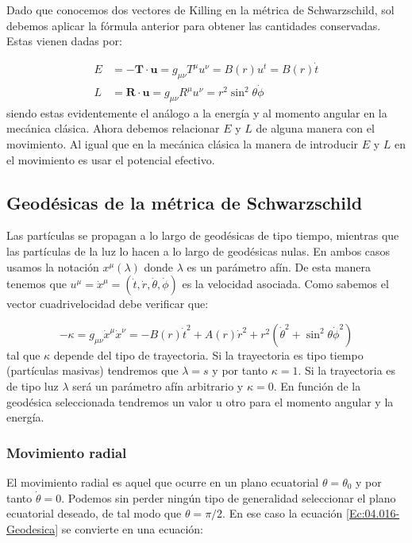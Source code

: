 \documentclass[12pt,a4paper]{book}
\numberwithin{equation}{section}
\numberwithin{figure}{section}
\newcommand{\un}{\mathbf{u}}
\newcommand{\Rn}{\mathbf{R}}
\newcommand{\Tn}{\mathbf{T}}
\begin{document}
Dado que conocemos dos vectores de Killing en la métrica de Schwarzschild, sol debemos aplicar la fórmula anterior para obtener las cantidades conservadas. Estas vienen dadas por:

\begin{align}
E  & = - \Tn \cdot \un = g_{\mu \nu} T^\mu u^\nu = B(r) u^t = B(r) \dot{t} \\
L  & =  \Rn \cdot \un = g_{\mu \nu} R^\mu u^\nu = r^2 \sin^2 \theta \dot{\phi}
\end{align}
siendo estas evidentemente el análogo a la energía y al momento angular en la mecánica clásica. Ahora debemos relacionar $E$ y $L$ de alguna manera con el movimiento. Al igual que en la mecánica clásica la manera de introducir $E$ y $L$ en el movimiento es usar el potencial efectivo. \\


\subsection{Geodésicas de la métrica de Schwarzschild}

Las partículas se propagan a lo largo de geodésicas de tipo tiempo, mientras que las partículas de la luz lo hacen a lo largo de geodésicas nulas. En ambos casos usamos la notación $x^\mu (\lambda)$ donde $\lambda$ es un parámetro afín. De esta manera tenemos que $u^\mu = \dot{x}^\mu=(\dot{t},\dot{r},\dot{\theta},\dot{\phi})$ es la velocidad asociada. Como sabemos el vector cuadrivelocidad debe verificar que:


\begin{equation}
- \kappa =g_{\mu \nu } \dot{x}^\mu \dot{x}^\nu = - B(r)\dot{t}^2 + A(r) \dot{r}^2 + r^2 (\dot{\theta}^2 + \sin^2 \theta \dot{\phi}^2) \label{Ec:04.016-Geodesica}
\end{equation}
tal que $\kappa$ depende del tipo de trayectoria. Si la trayectoria es tipo tiempo (partículas masivas) tendremos que $\lambda=s$ y por tanto $\kappa=1$. Si la trayectoria es de tipo luz $\lambda$ será un parámetro afín arbitrario y $\kappa=0$. En función de la geodésica seleccionada tendremos un valor u otro para el momento angular y la energía. 

\subsubsection{Movimiento radial}

El movimiento radial es aquel que ocurre en un plano ecuatorial $\theta=\theta_0$ y por tanto $\dot{\theta}=0$. Podemos sin perder ningún tipo de generalidad seleccionar el plano ecuatorial deseado, de tal modo que $\theta =  \pi /2$. En ese caso la ecuación \ref{Ec:04.016-Geodesica} se convierte en una ecuación:
\end{document}
